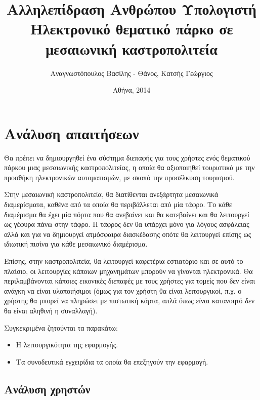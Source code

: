 \documentclass{assignment}
\title{Αλληλεπίδραση Ανθρώπου Υπολογιστή \\ Ηλεκτρονικό θεματικό πάρκο σε μεσαιωνική καστροπολιτεία}
\date{Αθήνα, 2014}
\author{Αναγνωστόπουλος Βασίλης - Θάνος, Κατσής Γεώργιος}
\begin{document}
\maketitle

\setcounter{page}{1} 

\pagestyle{plain}
\tableofcontents
\newpage


\pagestyle{fancy}
\setcounter{page}{1} 

\section{Ανάλυση απαιτήσεων}

Θα πρέπει να δημιουργηθεί ένα σύστημα διεπαφής για τους χρήστες ενός θεματικού πάρκου μιας μεσαιωνικής καστροπολιτείας, η οποία θα αξιοποιηθεί τουριστικά με την προσθήκη ηλεκτρονικών αυτοματισμών, με σκοπό την προσέλκυση τουρισμού.

Στην μεσαιωνική καστροπολιτεία, θα διατίθενται ανεξάρτητα μεσαιωνικά διαμερίσματα, καθένα από τα οποία θα περιβάλλεται από μία τάφρο. Το κάθε διαμέρισμα θα έχει μία πόρτα που θα ανεβαίνει και θα κατεβαίνει και θα λειτουργεί ως γέφυρα πάνω στην τάφρο. Η τάφρος δεν θα υπάρχει μόνο για λόγους ασφάλειας αλλά και για να δημιουργεί ατμόσφαιρα διασκέδασης οπότε θα λειτουργεί επίσης ως ιδιωτική πισίνα για κάθε μεσαιωνικό διαμέρισμα.

Επίσης, στην καστροπολιτεία, θα λειτουργεί καφετέρια-εστιατόριο και σε αυτό το πλαίσιο, οι λειτουργίες κάποιων μηχανημάτων μπορούν να γίνονται ηλεκτρονικά. Θα περιλαμβάνονται κάποιες εικονικές διεπαφές με τους χρήστες για τομείς που δεν είναι ανάγκη να είναι υλοποιήσιμοι (όμως για τον χρήστη θα είναι λειτουργικοί, π.χ. ο χρήστης θα μπορεί να πληρώσει με πιστωτική κάρτα, απλά όπως είναι κατανοητό δεν θα είναι αληθινή η συναλλαγή).  

Συγκεκριμένα ζητούνται τα παρακάτω:

\begin{itemize}
\item Η λειτουργικότητα της εφαρμογής.
\item Τα συνοδευτικά εγχειρίδια τα οποία θα επεξηγούν την εφαρμογή.
\end{itemize}

\subsection{Ανάλυση χρηστών}
\end{document}
